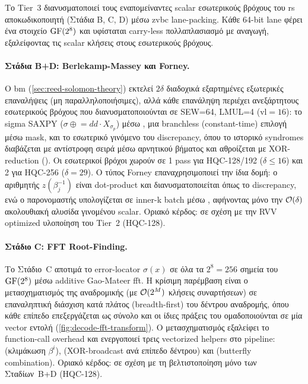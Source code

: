 Το Tier~3 διανυσματοποιεί τους εναπομείναντες scalar εσωτερικούς βρόχους του
\gls{rs} αποκωδικοποιητή (Στάδια B, C, D) μέσω \gls{zvbc} 
lane-packing. Κάθε 64-bit lane φέρει ένα στοιχείο $\mathrm{GF}(2^8)$ και υφίσταται 
carry-less πολλαπλασιασμό με αναγωγή, εξαλείφοντας τις scalar \Zbc {} 
κλήσεις στους εσωτερικούς βρόχους.

\paragraph{Στάδια B+D: Berlekamp-Massey και Forney.}
Ο \gls{bm} (\cref{sec:reed-solomon-theory}) εκτελεί $2\delta$ διαδοχικά εξαρτημένες
εξωτερικές επαναλήψεις (μη παραλληλοποιήσιμες), αλλά κάθε επανάληψη περιέχει
ανεξάρτητους εσωτερικούς βρόχους που διανυσματοποιούνται σε SEW=64, LMUL=4
($\text{vl}=16$): το sigma SAXPY ($\sigma \mathrel{\oplus}= dd \cdot
X_{\sigma_p}$) μέσω , μια branchless (constant-time) 
επιλογή μέσω mask, και το εσωτερικό γινόμενο του discrepancy, όπου το 
ιστορικό syndromes διαβάζεται με αντίστροφη σειρά μέσω  
αρνητικού βήματος και αθροίζεται με XOR-reduction (). 
Οι εσωτερικοί βρόχοι χωρούν σε \num{1} pass για HQC-128/192
($\delta \leq 16$) και \num{2} για HQC-256 ($\delta = 29$). Ο τύπος
Forney επαναχρησιμοποιεί την ίδια δομή: 
ο αριθμητής $z(\beta_j^{-1})$ είναι dot-product και διανυσματοποιείται 
όπως το discrepancy, ενώ ο παρονομαστής υπολογίζεται σε
inner-k batch μέσω , αφήνοντας μόνο την $\mathcal{O}(\delta)$
ακολουθιακή αλυσίδα γινομένου scalar. Οριακό κέρδος:  σε σχέση με
την RVV optimized υλοποίηση του Tier~2 (HQC-128).

\paragraph{Στάδιο C: FFT Root-Finding.}
Το Στάδιο~C αποτιμά το error-locator $\sigma(x)$ σε όλα τα $2^8 = 256$ σημεία
του $\mathrm{GF}(2^8)$ μέσω additive Gao-Mateer \gls{fft}. Η
κρίσιμη παρέμβαση είναι ο μετασχηματισμός της αναδρομικής  (με
$\mathcal{O}(2^M)$ κλήσεις συναρτήσεων) σε επαναληπτική διάσχιση κατά πλάτος 
(breadth-first) του δέντρου αναδρομής, 
όπου κάθε επίπεδο επεξεργάζεται ως σύνολο και οι ίδιες πράξεις του 
ομαδοποιούνται σε μία vector εντολή (\cref{fig:decode-fft-transform}). 
Ο μετασχηματισμός εξαλείφει το function-call overhead και
ενεργοποιεί τρεις vectorized helpers στο  pipeline:
 (κλιμάκωση $\beta^i$), 
(XOR-broadcast ανά επίπεδο δέντρου) και 
(butterfly combination). Οριακό κέρδος:  σε σχέση με τη 
βελτιστοποίηση μόνο των Σταδίων~B+D (HQC-128).

